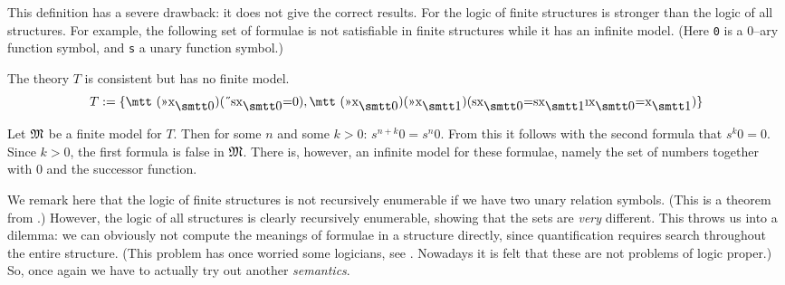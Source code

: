 This definition has a severe drawback: it does not give the
correct results. For the logic of finite structures is stronger
than the logic of all structures. For example, the following set
of formulae is not satisfiable in finite structures while it
has an infinite model. (Here {\tt 0} is a 0--ary function symbol,
and {\tt s} a unary function symbol.)
\begin{prop}
The theory $T$ is consistent but has no finite model.
\begin{equation}
T := \{\mbox{\mtt (\symbol{20}x$_{\snull}$)(\symbol{5}sx$_{\snull}$=0)},
\mbox{\mtt (\symbol{20}x$_{\snull}$)(\symbol{20}x$_{\seins}$)(sx$_{\snull}$%
=sx$_{\seins}$\symbol{25}x$_{\snull}$=x$_{\seins}$)}\}
\end{equation}
\end{prop}
\proofbeg
Let $\mathfrak{M}$ be a finite model for $T$. Then for some $n$ and some $k > 0$:
$s^{n+k}0 = s^n0$. From this it follows with the second formula that
$s^k 0 = 0$. Since $k > 0$, the first formula is false in $\mathfrak{M}$. There is,
however, an infinite model for these formulae, namely the set of
numbers together with 0 and the successor function.
\proofend

We remark here that the logic of finite structures is not
recursively enumerable if we have two unary relation symbols.
(This is a theorem from \cite{trakhtenbrodt:finite}.) 
However,
the logic of all structures is clearly recursively enumerable,
showing that the sets are {\it very\/} different. This throws us 
into a dilemma: we can obviously not compute the meanings of
formulae in a structure directly, since quantification
requires search throughout the entire structure. (This
problem has once worried some logicians, see \cite{ferreiros:road}.
Nowadays it is felt that these are not problems of logic proper.)
So, once again we have to actually try out another {\it semantics}.

